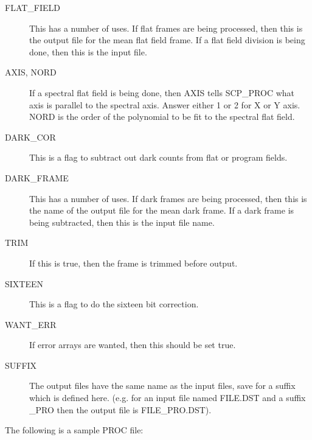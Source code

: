 \begin{description}
\item [FLAT\_FIELD] This has a number of uses. If flat frames are being
processed, then this is the output file for the mean flat field frame. If a
flat field division is being done, then this is the input file.

\item [AXIS, NORD] If a spectral flat field is being done, then  AXIS tells
SCP\_PROC what axis is parallel to the spectral axis. Answer either  1 or 2 for
X or Y axis. NORD is the order of the polynomial to be fit to the spectral flat
field.

\item [DARK\_COR] This is a flag to subtract out dark counts from flat or
program fields.

\item [DARK\_FRAME] This has a number of uses.  If dark frames are being 
processed, then this is the name of the output file for the mean dark frame. If
a dark frame is being subtracted, then this is the input file name.

\item [TRIM] If this is true, then the frame is trimmed before output.

\item [SIXTEEN] This is a flag to do the sixteen bit correction.

\item [WANT\_ERR] If error arrays are wanted, then this should be set true.

\item [SUFFIX] The output files have the same name as the input files, save for
a suffix which is defined here. (e.g. for an input file named FILE.DST and a
suffix \_PRO then the output file is FILE\_PRO.DST).

\end{description}


\newpage

The following is a sample PROC file:

